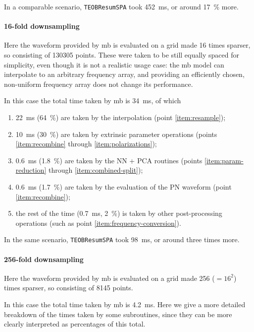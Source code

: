 \documentclass[main.tex]{subfiles}
\begin{document}
In a comparable scenario, \texttt{TEOBResumSPA} took \SI{452}{ms}, or around \SI{17}{\%} more. 

\paragraph{16-fold downsampling}

Here the waveform provided by \ac{mb} is evaluated on a grid made 16 times sparser, so consisting of 130305 points.
These were taken to be still equally spaced for simplicity, even though it is not a realistic usage case: the \ac{mb} model can interpolate to an arbitrary frequency array, and providing an efficiently chosen, non-uniform frequency array does not change its performance. 

In this case the total time taken by \ac{mb} is \SI{34}{ms}, of which 
\begin{enumerate}
    \item \SI{22}{ms} (\SI{64}{\%}) are taken by the interpolation (point \ref{item:resample});
    \item \SI{10}{ms} (\SI{30}{\%}) are taken by extrinsic parameter operations (points \ref{item:recombine} through \ref{item:polarizations});
    \item \SI{0.6}{ms} (\SI{1.8}{\%}) are taken by the \ac{NN} + \ac{PCA} routines (points \ref{item:param-reduction} through \ref{item:combined-split});
    \item \SI{0.6}{ms} (\SI{1.7}{\%}) are taken by the evaluation of the \ac{PN} waveform (point \ref{item:recombine});
    \item the rest of the time (\SI{0.7}{ms}, \SI{2}{\%}) is taken by other post-processing operations (such as point \ref{item:frequency-conversion}).
\end{enumerate}

In the same scenario, \texttt{TEOBResumSPA} took \SI{98}{ms}, or around three times more. 

\paragraph{256-fold downsampling}

Here the waveform provided by \ac{mb} is evaluated on a grid made 256 (\( = 16^2\)) times sparser, so consisting of 8145 points.

In this case the total time taken by \ac{mb} is \SI{4.2}{ms}.
Here we give a more detailed breakdown of the times taken by some subroutines, since they can be more clearly interpreted as percentages of this total. 
\end{document}
